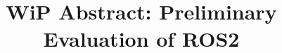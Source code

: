 \documentclass{sig-alternate-ipsn13}
\begin{document}
\title{WiP Abstract: Preliminary Evaluation of ROS2}
%
%
%
%
%
\end{document}
